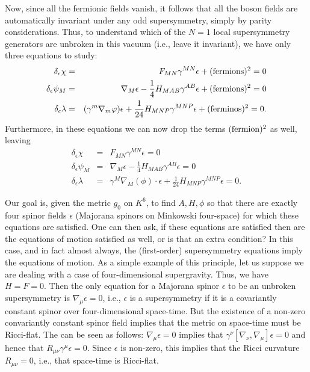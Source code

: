 Now, since all the fermionic fields vanish, it follows that all the
boson fields are 
automatically invariant under any odd supersymmetry, simply by parity
considerations. Thus, to understand which of the $N=1$ local
supersymmetry generators are unbroken in this vacuum (i.e., leave it
invariant), we have only three equations to
study: 
\begin{eqnarray*}
\delta_\epsilon\chi & = & F_{MN}\gamma^{MN}\epsilon+({\rm fermions})^2 =0\\
\delta_\epsilon\psi_M  &  =  &  \nabla_M\epsilon -\frac{1}{4}
H_{MAB}\gamma^{AB}\epsilon +({\rm fermions})^2=0 \\
\delta_\epsilon\lambda  &  =  & (\gamma^m \nabla_m\varphi)\epsilon
+\frac{1}{24}H_{MNP}\gamma^{MNP}\epsilon +({\rm ferminos})^2=0. \\
\end{eqnarray*}
Furthermore, in these equations we can now drop the terms ${\rm (fermion})^2$
as well, leaving
\begin{eqnarray}\label{system1}
\delta_\epsilon\chi & = & F_{MN}\gamma^{MN}\epsilon =0 \\
\delta_\epsilon\psi_M  &  =  &  \nabla_M\epsilon -\frac{1}{4}
H_{MAB}\gamma^{AB}\epsilon  =0\label{system2} \\
\delta_\epsilon\lambda  &  =  &  \gamma^M\nabla_M(\phi)\cdot\epsilon
+\frac{1}{24}H_{MNP}\gamma^{MNP}\epsilon =0.\label{system3}
\end{eqnarray}


Our goal is, given the metric $g_0$ on $K^6$, to find $A, H,\phi$ so
that there are exactly four spinor fields $\epsilon$ (Majorana spinors
on  Minkowski four-space) for which these equations are
satisfied. 
One can then ask, if these equations are satisfied then are the
equations of motion satisfied as well, or is that an extra
condition? In this case, and in fact almost always, the (first-order)
supersymmetry equations imply the equations of motion.
As a simple example of this principle, let us suppose we are dealing
with a case of four-dimensional supergravity.
Thus, we have $H=F=0$.  Then the only equation for a Majorana spinor
$\epsilon$ to be an unbroken supersymmetry  is
$\nabla_\mu\epsilon=0$, i.e., $\epsilon$ is a supersymmetry if it is a
covariantly constant spinor over four-dimensional space-time. 
But the existence of a non-zero convariantly constant spinor field
implies that the metric on space-time must be Ricci-flat. 
The can be seen as follows:
$\nabla_\mu\epsilon=0$ implies that
$\gamma^\nu[\nabla_\nu,\nabla_\mu]\epsilon=0$ and hence that
$R_{\mu\nu}\gamma^\mu\epsilon=0$. Since $\epsilon$ is non-zero, this  
implies  that the Ricci curvature $R_{\mu\nu}=0$, i.e., that
space-time is Ricci-flat.

